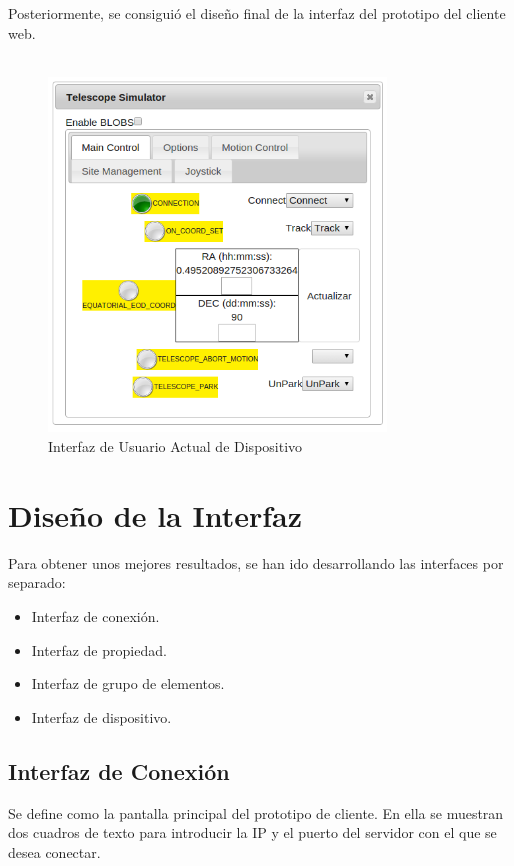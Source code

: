 Posteriormente, se consiguió el diseño final de la interfaz del prototipo del cliente web.\\ \\

\begin{figure}[htb]
\centering
\includegraphics[width=0.8\textwidth]{./imagenes/interfazActual}
\caption{Interfaz de Usuario Actual de Dispositivo} \label{fig:interfazActual}
\end{figure}

\section{Diseño de la Interfaz}
Para obtener unos mejores resultados, se han ido desarrollando las interfaces por separado:
\begin{itemize}
  \item Interfaz de conexión.
  \item Interfaz de propiedad.
  \item Interfaz de grupo de elementos.
  \item Interfaz de dispositivo.
\end{itemize}

\subsection{Interfaz de Conexión}
Se define como la pantalla principal del prototipo de cliente. En ella se muestran dos cuadros de texto para introducir la IP y el puerto del servidor con el que se desea conectar.

